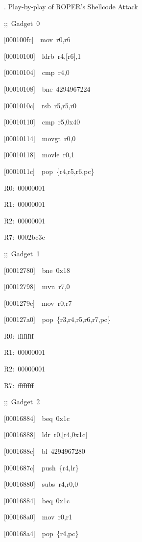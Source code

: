 \documentclass[9pt]{beamer}
\newcommand{\Gap} { \\ \pause \vspace{8pt} }
\begin{document}
\begin{frame}{\theframenumber. Play-by-play of ROPER's Shellcode Attack}
\begin{multicols}{3}
\tiny
{\color{title};;~Gadget~0}

[000100fc]~~mov~r0,r6

[00010100]~~ldrb~r4,[r6],1

[00010104]~~cmp~r4,0

[00010108]~~bne~4294967224

[0001010c]~~rsb~r5,r5,r0

[00010110]~~cmp~r5,0x40

[00010114]~~movgt~r0,0

[00010118]~~movle~r0,1

[0001011c]~~pop~\{r4,r5,r6,pc\}
\vspace{4pt}

R0:~00000001

R1:~00000001

R2:~00000001

R7:~0002bc3e
\Gap

{\color{title};;~Gadget~1}

[00012780]~~bne~0x18

[00012798]~~mvn~r7,0

[0001279c]~~mov~r0,r7

[000127a0]~~pop~\{r3,r4,r5,r6,r7,pc\}
\vspace{4pt}

R0:~ffffffff

R1:~00000001

R2:~00000001

R7:~ffffffff
\Gap
\columnbreak


{\color{title};;~Gadget~2}

[00016884]~~beq~0x1c

[00016888]~~ldr~r0,[r4,0x1c]



\alert<@+|+-> {[0001688c]~~bl~4294967280}

\alert<@+|+-> {[0001687c]~~push~\{r4,lr\}}

[00016880]~~subs~r4,r0,0

[00016884]~~beq~0x1c

[000168a0]~~mov~r0,r1

[000168a4]~~pop~\{r4,pc\}
\vspace{4pt}



\end{multicols}
\end{frame}
\end{document}
